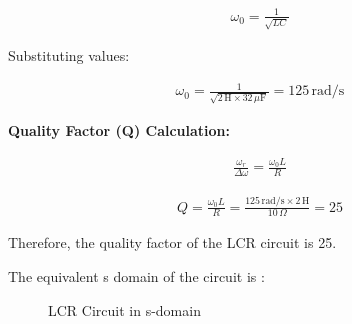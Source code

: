 \documentclass[journal,12pt,twocolumn]{IEEEtran}
\theoremstyle{remark}
\begin{document}
\begin{align}
\omega_0 = \frac{1}{\sqrt{LC}}
\end{align}

Substituting values:

\begin{align}
\omega_0 = \frac{1}{\sqrt{2 \, \text{H} \times 32 \, \mu\text{F}}} = 125 \, \text{rad/s}
\end{align}

\textbf{Quality Factor (Q) Calculation:}

\begin{align}
\frac{\omega_r}{\Delta \omega} = \frac{\omega_0 L}{R}
\end{align}

\begin{align}
Q = \frac{\omega_0 L}{R} = \frac{125 \, \text{rad/s} \times 2 \, \text{H}}{10 \, \Omega} = 25
\end{align}

Therefore, the quality factor of the LCR circuit is 25.


The equivalent s domain of the circuit is :

\begin{figure}[h]
 \centering
    
    \caption{LCR Circuit in s-domain}
    
\end{figure}
\end{document}
